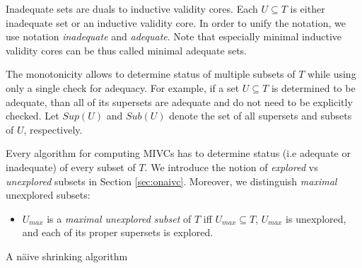 


Inadequate sets are duals to inductive validity cores. Each $U \subseteq T$ is either inadequate set or an inductive validity core. In order to unify the notation, we   use notation \emph{inadequate} and \emph{adequate}. Note that especially minimal inductive validity cores can be thus called  minimal adequate sets.

The monotonicity allows to determine status of multiple subsets of $T$ while using only a single check for adequacy. For example, if a set $U \subseteq T$ is determined to be adequate, than all of its supersets are   adequate and do not need to be explicitly checked. Let     $\mathit{Sup}(U)$ and $\mathit{Sub}(U)$ denote the set of all supersets and subsets of $U$, respectively.

Every algorithm for computing MIVCs has to determine status (i.e adequate or inadequate) of every subset of $T$. We introduce the notion of \emph{explored} vs \emph{unexplored} subsets in Section \ref{sec:onaivc}.
Moreover, we distinguish \emph{maximal} unexplored subsets:

\vspace{-5pt}
\begin{itemize}
	\item $U_{max}$ is a \emph{maximal unexplored subset} of $T$ iff $U_{max} \subseteq T$, $U_{max}$ is unexplored, and each of its proper supersets is explored.
\end{itemize}
\vspace{-5pt}


\begin{algorithm}[!t]
\begin{small}

\caption{A n\"aive shrinking algorithm }
\label{shrink-procedure}
\end{small}
\end{algorithm}


